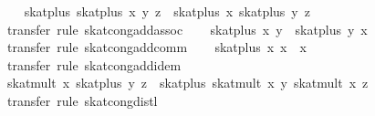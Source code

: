 \begin{isabellebody}
\ \ \isamarkupfalse%
\ {}skat{}plus\ {}skat{}plus\ x\ y{}\ z\ {}\ skat{}plus\ x\ {}skat{}plus\ y\ z{}{}\isanewline
\ \ \ \ \isamarkupfalse%
\ {}transfer{}\ rule\ skat{}cong{}add{}assoc{}\isanewline
\ \ \isamarkupfalse%
\ {}skat{}plus\ x\ y\ {}\ skat{}plus\ y\ x{}\isanewline
\ \ \ \ \isamarkupfalse%
\ {}transfer{}\ rule\ skat{}cong{}add{}comm{}\isanewline
\ \ \isamarkupfalse%
\ {}skat{}plus\ x\ x\ {}\ x{}\isanewline
\ \ \ \ \isamarkupfalse%
\ {}transfer{}\ rule\ skat{}cong{}add{}idem{}\isanewline
\ \ \isamarkupfalse%
\ {}skat{}mult\ x\ {}skat{}plus\ y\ z{}\ {}\ skat{}plus\ {}skat{}mult\ x\ y{}\ {}skat{}mult\ x\ z{}{}\isanewline
\ \ \ \ \isamarkupfalse%
\ {}transfer{}\ rule\ skat{}cong{}distl{}\isanewline

\end{isabellebody}
